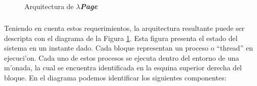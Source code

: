 \documentclass[a4paper]{article}
\newcommand{\hpage}{\textbf{\textsl{$\lambda$Page}}}
\begin{document}
\begin{figure}[hp]
	\begin{center}
		\caption{Arquitectura de \hpage}
		\label{arq1}
	\end{center}
\end{figure}
\subparagraph{}Teniendo en cuenta estos requerimientos, la arquitectura resultante puede ser descripta con el diagrama de la Figura \ref{arq1}.  Esta figura presenta el estado del sistema en un instante dado.  Cada bloque representan un proceso o ``thread'' en ejecuci'on.  Cada uno de estos procesos se ejecuta dentro del entorno de una m'onada, la cual se encuentra identificada en la esquina superior derecha del bloque.  En el diagrama podemos identificar los siguientes componentes:
\end{document}

